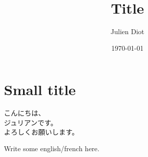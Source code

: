 \documentclass[12pt,a4paper]{article}
\author{Julien Diot}
\title{Title}
\date{\today}
\begin{document}
\section*{Small title}

\begin{CJK}{UTF8}{min}
こんにちは、\\

ジュリアンです。\\

よろしくお願いします。
\end{CJK}	
\bigskip

Write some english/french here.
\end{document}
